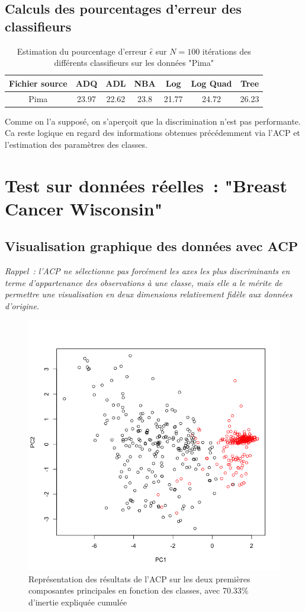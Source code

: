 \documentclass[a4paper,10pt]{report}
\begin{document}
\subsection{Calculs des pourcentages d'erreur des classifieurs}
\begin{table}[H]
	\centering
	\captionsetup{justification=centering, margin=4cm}
	\begin{tabular}{c|c|c|c|c|c|c}
		Fichier source & ADQ & ADL & NBA & Log & Log Quad & Tree \\ 
		\hline
		Pima & 23.97 & 22.62 & 23.8 & 21.77 & 24.72 & 26.23  \\ 
	\end{tabular}
	\caption{\small Estimation du pourcentage d'erreur $\hat{\epsilon}$ sur $N=100$ itérations des différents classifieurs sur les données "Pima"}
	\label{table:2-1-erreur-data-pima}
\end{table}

Comme on l'a supposé, on s'aperçoit que la discrimination n'est pas performante. Ca reste logique en regard des informations obtenues précédemment via l'ACP et l'estimation des paramètres des classes.

\section{Test sur données réelles~: "Breast Cancer Wisconsin"}

\subsection{Visualisation graphique des données avec ACP}

\textit{Rappel~: l'ACP ne sélectionne pas forcément les axes les plus discriminants en terme d'appartenance des observations à une classe, mais elle a le mérite de permettre une visualisation en deux dimensions relativement fidèle aux données d'origine.}\\


\begin{figure}[H]
	\centering
	\captionsetup{justification=centering, margin=2cm}
	\includegraphics[width=.5\linewidth]{img/2-2-1-ACP-Brestcancer-representation}
	\caption{\small Représentation des résultats de l'ACP sur les deux premières composantes principales en fonction des classes, avec 70.33\% d'inertie expliquée cumulée}
	\label{fig:2-2-1-ACP-Brestcancer-representation}%
\end{figure}
\end{document}

